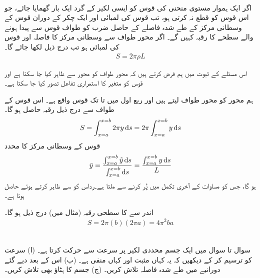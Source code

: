 \\
اگر ایک ہموار مستوی منحنی کی قوس کو ایسی لکیر کے گرد ایک بار گھمایا جائے،  جو اس قوس کو قطع نہ کرتی ہو، تب قوس کی لمبائی اور  ایک چکر کے دوران قوس کے وسطانی مرکز کے طے شدہ فاصلے  کے حاصل ضرب کو طواف  قوس سے پیدا ہونے والے سطحے کا رقبہ کہیں گے۔  اگر محور طواف سے وسطانی مرکز کا فاصلہ   اور قوس کی لمبائی   ہو تب درج ذیل لکھا جائے گا۔
\begin{align}
S=2\pi \rho L
\end{align} 

اس مسئلے کے ثبوت میں ہم فرض کرتے ہیں کہ محور طواف کو محور  سے ظاہر کیا جا سکتا ہے  اور قوس کو متغیر  کا استمراری تفاعل تصور کیا جا سکتا ہے۔

ہم محور  کو محور طواف لیتے ہیں اور ربع اول میں  تا  تک قوس واقع ہے۔ اس قوس کے طواف سے درج ذیل رقبہ حاصل ہو گا۔
\begin{align}\label{مساوات_تکمل_استعمال_مسئلہ_پاپس_رقبہ}
S=\int_{x=a}^{x=b} 2\pi y\dif s=2\pi\int_{x=a}^{x=b}y\dif s
\end{align}
قوس کے وسطانی مرکز کا  محدد 
\begin{align*}
\bar{y}=\frac{\int_{x=a}^{x=b}\tilde{y}\dif s}{\int_{x=a}^{x=b}\dif s}=\frac{\int_{x=a}^{x=b}y\dif s}{L}
\end{align*}
ہو گا، جس کو مساوات   کے آخری تکمل میں پُر کرنے سے  ملتا ہے۔رداس  کو  سے ظاہر کرتے ہوئے   حاصل ہوتا ہے۔

اندر سے کا سطحی رقبہ (مثال  میں) درج ذیل ہو گا۔
\begin{align*}
S=2\pi(b)(2\pi a)=4\pi^2ba
\end{align*}

\\
سوال  تا سوال  میں ایک جسم محددی لکیر پر سرعت  سے حرکت کرتا ہے۔ (ا) سرعت کو ترسیم کر کے دیکھیں کہ یہ  کہاں  مثبت اور کہاں منفی ہے۔ (ب) اس کے بعد دیے گئے دورانیے میں طے شدہ فاصلہ تلاش کریں۔ (ج) جسم کا ہٹاؤ بھی تلاش کریں۔

